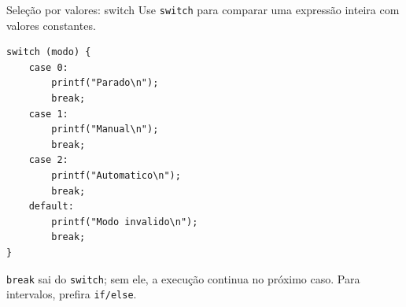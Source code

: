 \begin{frame}[fragile]{Seleção por valores: switch}
\small
Use \texttt{switch} para comparar uma expressão inteira com valores constantes.
\begin{lstlisting}
switch (modo) {
    case 0:
        printf("Parado\n");
        break;
    case 1:
        printf("Manual\n");
        break;
    case 2:
        printf("Automatico\n");
        break;
    default:
        printf("Modo invalido\n");
        break;
}
\end{lstlisting}
\texttt{break} sai do \texttt{switch}; sem ele, a execução continua no próximo caso. Para intervalos, prefira \texttt{if/else}.
\end{frame}
